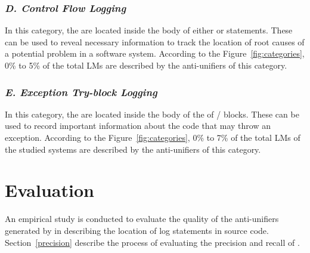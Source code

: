 \subsubsection{\emph{D. Control Flow Logging}}  \label{Exception try-block logging}
In this category, the  are located inside the body of either  or  statements. These  can be used to reveal necessary information to track the location of root causes of a potential problem in a software system. According to the Figure~\ref{fig:categories}, 0\% to 5\% of the total LMs are described by the anti-unifiers of this category.


\subsubsection{\emph{E. Exception Try-block Logging}}  \label{Exception try-block logging}
In this category, the  are located inside the body of the   of / blocks. These  can be used to record important information about the code that may throw an exception. According to the Figure~\ref{fig:categories}, 0\% to 7\% of the total LMs of the studied systems are described by the anti-unifiers of this category.


\section{Evaluation}  \label{evaluation}

An empirical study is conducted to evaluate the quality of the anti-unifiers generated by  in describing the location of log statements in source code. Section~\ref{precision} describe the process of evaluating the precision and recall of .


